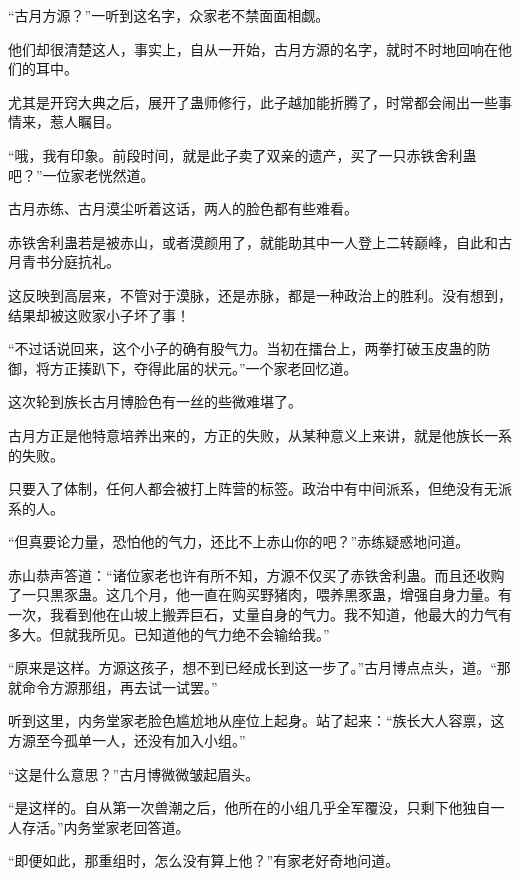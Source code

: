 
\begin{this_body}

“古月方源？”一听到这名字，众家老不禁面面相觑。

他们却很清楚这人，事实上，自从一开始，古月方源的名字，就时不时地回响在他们的耳中。

尤其是开窍大典之后，展开了蛊师修行，此子越加能折腾了，时常都会闹出一些事情来，惹人瞩目。

“哦，我有印象。前段时间，就是此子卖了双亲的遗产，买了一只赤铁舍利蛊吧？”一位家老恍然道。

古月赤练、古月漠尘听着这话，两人的脸色都有些难看。

赤铁舍利蛊若是被赤山，或者漠颜用了，就能助其中一人登上二转巅峰，自此和古月青书分庭抗礼。

这反映到高层来，不管对于漠脉，还是赤脉，都是一种政治上的胜利。没有想到，结果却被这败家小子坏了事！

“不过话说回来，这个小子的确有股气力。当初在擂台上，两拳打破玉皮蛊的防御，将方正揍趴下，夺得此届的状元。”一个家老回忆道。

这次轮到族长古月博脸色有一丝的些微难堪了。

古月方正是他特意培养出来的，方正的失败，从某种意义上来讲，就是他族长一系的失败。

只要入了体制，任何人都会被打上阵营的标签。政治中有中间派系，但绝没有无派系的人。

“但真要论力量，恐怕他的气力，还比不上赤山你的吧？”赤练疑惑地问道。

赤山恭声答道：“诸位家老也许有所不知，方源不仅买了赤铁舍利蛊。而且还收购了一只黒豕蛊。这几个月，他一直在购买野猪肉，喂养黒豕蛊，增强自身力量。有一次，我看到他在山坡上搬弄巨石，丈量自身的气力。我不知道，他最大的力气有多大。但就我所见。已知道他的气力绝不会输给我。”

“原来是这样。方源这孩子，想不到已经成长到这一步了。”古月博点点头，道。“那就命令方源那组，再去试一试罢。”

听到这里，内务堂家老脸色尴尬地从座位上起身。站了起来：“族长大人容禀，这方源至今孤单一人，还没有加入小组。”

“这是什么意思？”古月博微微皱起眉头。

“是这样的。自从第一次兽潮之后，他所在的小组几乎全军覆没，只剩下他独自一人存活。”内务堂家老回答道。

“即便如此，那重组时，怎么没有算上他？”有家老好奇地问道。


\end{this_body}
